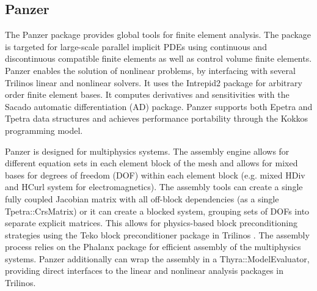 \subsection{Panzer}
The Panzer package provides global tools for finite element analysis. The package is targeted for large-scale parallel implicit PDEs using continuous and discontinuous compatible finite elements as well as control volume finite elements. Panzer enables the solution of nonlinear problems, by interfacing with several Trilinos linear and nonlinear solvers. It uses the Intrepid2 package for arbitrary order finite element bases. It computes derivatives and sensitivities with the Sacado automatic differentiation (AD) package. Panzer supports both Epetra and Tpetra data structures and achieves performance portability through the Kokkos programming model.

Panzer is designed for multiphysics systems. The assembly engine allows for different equation sets in each element block of the mesh and allows for mixed bases for degrees of freedom (DOF) within each element block (e.g. mixed HDiv and HCurl system for electromagnetics). The assembly tools can create a single fully coupled Jacobian matrix with all off-block dependencies (as a single Tpetra::CrsMatrix) or it can create a blocked system, grouping sets of DOFs into separate explicit matrices. This allows for physics-based block preconditioning strategies using the Teko block preconditioner package in Trilinos \cite{Bonilla2023,Cyr2016a}. The assembly process relies on the Phalanx package for efficient assembly of the multiphysics systems. Panzer additionally can wrap the assembly in a Thyra::ModelEvaluator, providing direct interfaces to the linear and nonlinear analysis packages in Trilinos.

